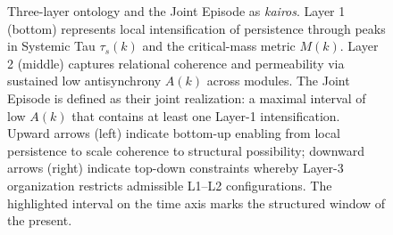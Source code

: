 \begin{figure}[htbp]
\centering

\caption{Three-layer ontology and the Joint Episode as \textit{kairos}. Layer 1 (bottom) represents local intensification of persistence through peaks in Systemic Tau $\tau_s(k)$ and the critical-mass metric $M(k)$. Layer 2 (middle) captures relational coherence and permeability via sustained low antisynchrony $A(k)$ across modules. The Joint Episode is defined as their joint realization: a maximal interval of low $A(k)$ that contains at least one Layer-1 intensification. Upward arrows (left) indicate bottom-up enabling from local persistence to scale coherence to structural possibility; downward arrows (right) indicate top-down constraints whereby Layer-3 organization restricts admissible L1--L2 configurations. The highlighted interval on the time axis marks the structured window of the present.}
\label{fig:three_layers_je}
\end{figure}

